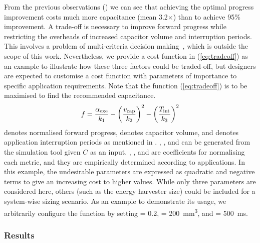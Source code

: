 From the previous observations () we can see that achieving the optimal progress improvement costs much more capacitance (mean 3.2$\times$) than to achieve 95\% improvement. 
A trade-off is necessary to improve forward progress while restricting the overheads of increased capacitor volume and interruption periods. 
This involves a problem of multi-criteria decision making~\cite{triantaphyllou2000multi}, which is outside the scope of this work. 
Nevertheless, we provide a cost function in (\ref{eq:tradeoff}) as an example to illustrate how these three factors could be traded-off, but designers are expected to customise a cost function with parameters of importance to specific application requirements. 
Note that the function (\ref{eq:tradeoff}) is to be maximised to find the recommended capacitance. 
\begin{equation}
    f = \frac{\alpha_{\text{exe}}}{k_{\text{1}}} - \left(\frac{v_{\text{cap}}}{k_{\text{2}}}\right) ^ {2} - \left(\frac{T_{\text{int}}}{k_{\text{3}}}\right) ^ {2} 
    \label{eq:tradeoff}
\end{equation}
 denotes normalised forward progress,  denotes capacitor volume, and  denotes application interruption periods as mentioned in . 
, , and  can be generated from the simulation tool given $C$ as an input. 
, , and  are coefficients for normalising each metric, and they are empirically determined according to applications. 
In this example, the undesirable parameters are expressed as quadratic and negative terms to give an increasing cost to higher values. 
While only three parameters are considered here, others (such as the energy harvester size) could be included for a system-wise sizing scenario.
As an example to demonstrate its usage, we arbitrarily configure the function by setting  = 0.2,  = \SI{200}{\cubic\milli\meter}, and  = \SI{500}{\milli\second}. 

\subsubsection{Results}

